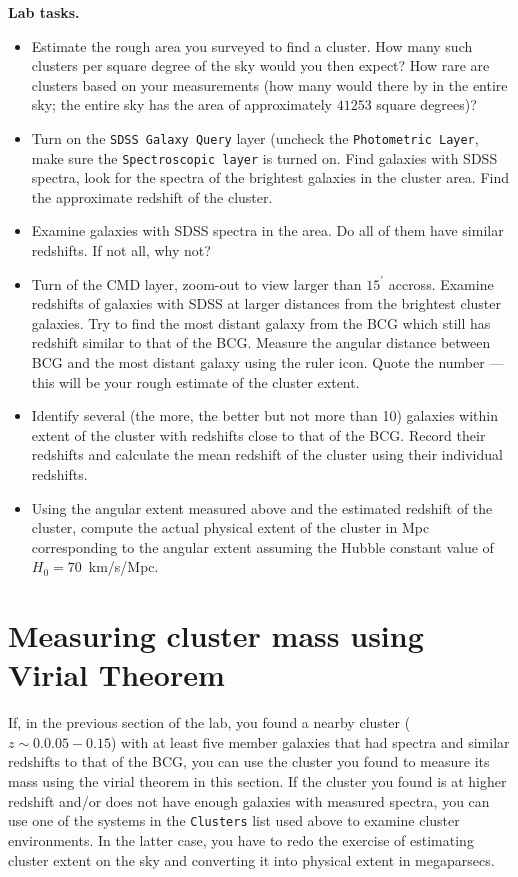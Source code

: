 \documentclass[12pt]{article}
\begin{document}
{\bf Lab tasks.} 
{\it
\begin{itemize}
\item Estimate the rough area you surveyed to find a cluster. How many such clusters per square degree of the sky would you then expect? How rare are clusters based on your measurements (how many would there by in the entire sky; the entire sky has the area of approximately $41253$ square degrees)?
\item Turn on the {\tt SDSS Galaxy Query} layer (uncheck the {\tt Photometric Layer}, make
sure the {\tt Spectroscopic layer} is turned on. Find galaxies with SDSS spectra, look for
the spectra of the brightest galaxies in the cluster area. Find the approximate redshift
of the cluster. 
\item Examine galaxies with SDSS spectra in the area. Do all of them have similar redshifts. 
If not all, why not?
\item Turn of the CMD layer, zoom-out to view larger than $15^{'}$ accross. Examine
redshifts of galaxies with SDSS at larger distances from the brightest cluster galaxies. 
Try to find the most distant galaxy from the BCG which still has redshift similar to that
of the BCG. Measure the angular distance between BCG and the most distant galaxy using the ruler
icon. Quote the number --- this will be your rough estimate of the cluster extent. 
\item Identify several (the more, the better but not more than 10) 
galaxies within extent of the cluster with redshifts close to that
of the BCG. Record their redshifts and calculate the mean redshift of the cluster using
their individual redshifts. 
\item Using the angular extent measured above and the estimated redshift of the cluster, 
compute the actual physical extent of the cluster in Mpc corresponding to the angular extent
assuming the Hubble constant value of $H_0=70$~km/s/Mpc. 
\end{itemize}
}

\section*{Measuring cluster mass using Virial Theorem}

If, in the previous section of the lab, you found a nearby cluster ($z\sim 0.0.05-0.15$) with 
at least five member galaxies that had spectra and similar redshifts to that of the BCG, you can use
the cluster you found to measure its mass using the virial theorem in this section. If the cluster
you found is at higher redshift and/or does not have enough galaxies with measured spectra, you can
use one of the systems in the {\tt Clusters} list used above to examine cluster environments. 
In the latter case, you have to redo the exercise of estimating cluster extent on the sky and
converting it into physical extent in megaparsecs. 
\end{document}
